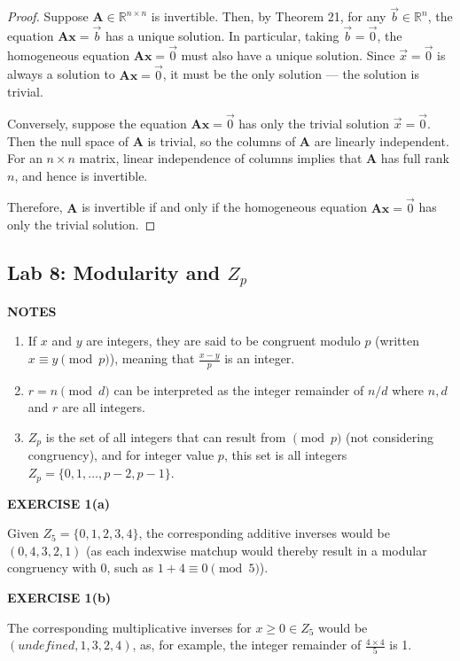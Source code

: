 \documentclass[12pt]{article}
\newcommand{\mat}[1]{\mathbf{#1}}
\newcommand{\exercise}[1]{\textbf{EXERCISE #1}\label{#1}}
\newcommand{\notes}{\textbf{NOTES}}
\begin{document}
\begin{proof}
Suppose \( \mat{A} \in \mathbb{R}^{n \times n} \) is invertible. Then, by Theorem 21, for any \( \vec{b} \in \mathbb{R}^n \), the equation \( \mat{Ax} = \vec{b} \) has a unique solution. In particular, taking \( \vec{b} = \vec{0} \), the homogeneous equation \( \mat{Ax} = \vec{0} \) must also have a unique solution. Since \( \vec{x} = \vec{0} \) is always a solution to \( \mat{Ax} = \vec{0} \), it must be the only solution — the solution is trivial.

Conversely, suppose the equation \( \mat{Ax} = \vec{0} \) has only the trivial solution \( \vec{x} = \vec{0} \). Then the null space of \( \mat{A} \) is trivial, so the columns of \( \mat{A} \) are linearly independent. For an \( n \times n \) matrix, linear independence of columns implies that \( \mat{A} \) has full rank \( n \), and hence is invertible.

Therefore, \( \mat{A} \) is invertible if and only if the homogeneous equation \( \mat{Ax} = \vec{0} \) has only the trivial solution.
\end{proof}

\subsection{Lab 8: Modularity and $Z_{p}$}

\notes

\begin{enumerate}
  \item If $x$ and $y$ are integers, they are said to be congruent modulo $p$ (written $x \equiv y \pmod{p}$), meaning that $\frac{x - y}{p}$ is an integer.
\item $r = n \pmod{d}$ can be interpreted as the integer remainder of $n/d$ where $n, d$ and $r$ are all integers.
\item $Z_{p}$ is the set of all integers that can result from $\pmod{p}$ (not considering congruency), and for integer value $p$, this set is all integers $Z_{p} = \{ 0, 1, \dots, p-2, p-1 \}$. 
\end{enumerate}

\exercise{1(a)}

Given $Z_{5} = \{0, 1, 2, 3, 4 \}$, the corresponding additive inverses would be $(0, 4, 3, 2, 1)$ (as each indexwise matchup would thereby result in a modular congruency with 0, such as $1 + 4 \equiv 0 \pmod{5}$).

\exercise{1(b)}

The corresponding multiplicative inverses for $x \ge 0 \in Z_{5}$ would be $(\textit{undefined}, 1, 3, 2, 4)$, as, for example, the integer remainder of $\frac{4 \times 4}{5}$ is 1. 
\end{document}
